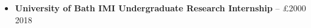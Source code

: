 \begin{itemize}
    \item \textbf{University of Bath IMI Undergraduate Research Internship} -- £2000 \hfill 2018\\
\end{itemize}